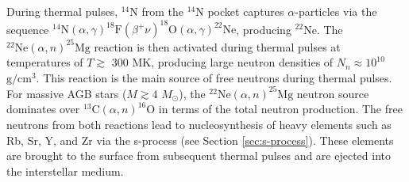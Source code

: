 
During thermal pulses, $^{14}$N from the $^{14}$N pocket captures $\alpha$-particles via the sequence $^{14}\mathrm{N}(\alpha,\gamma)^{18}\mathrm{F}(\beta^{+}\nu)^{18}\mathrm{O}(\alpha,\gamma)^{22}\mathrm{Ne}$, producing $^{22}$Ne. The $^{22}\mathrm{Ne}(\alpha,n)^{25}\mathrm{Mg}$ reaction is then activated during thermal pulses at temperatures of $T \gtrsim$ 300 MK, producing large neutron densities of $N_{n} \approx 10^{10}$ $\mathrm{g}/\mathrm{cm}^{3}$. This reaction is the main source of free neutrons during thermal pulses. For massive AGB stars ($M \gtrsim 4$ $M_{\odot}$), the $^{22}\mathrm{Ne}(\alpha,n)^{25}\mathrm{Mg}$ neutron source dominates over $^{13}\mathrm{C}(\alpha,n)^{16}\mathrm{O}$ in terms of the total neutron production. The free neutrons from both reactions lead to nucleosynthesis of heavy elements such as Rb, Sr, Y, and Zr via the s-process (see Section \ref{sec:s-process}). These elements are brought to the surface from subsequent thermal pulses and are ejected into the interstellar medium.

